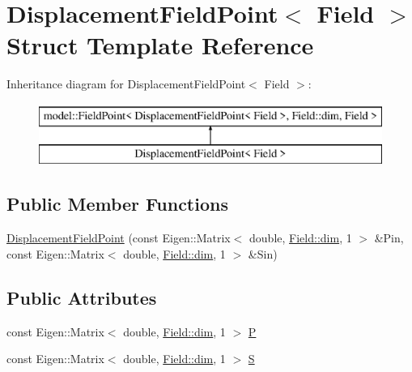 \hypertarget{struct_displacement_field_point}{}\section{Displacement\+Field\+Point$<$ Field $>$ Struct Template Reference}
\label{struct_displacement_field_point}
Inheritance diagram for Displacement\+Field\+Point$<$ Field $>$\+:\begin{figure}[H]
\begin{center}
\leavevmode
\includegraphics[height=2.000000cm]{struct_displacement_field_point}
\end{center}
\end{figure}
\subsection*{Public Member Functions}
\begin{DoxyCompactItemize}
\item 
\hyperlink{struct_displacement_field_point_ac0c7ee0a593a0f5d744060bf7149ab1b}{Displacement\+Field\+Point} (const Eigen\+::\+Matrix$<$ double, \hyperlink{plot_nd_a_8m_a382f3ca768b275b8d563604f7fc7df73}{Field\+::dim}, 1 $>$ \&Pin, const Eigen\+::\+Matrix$<$ double, \hyperlink{plot_nd_a_8m_a382f3ca768b275b8d563604f7fc7df73}{Field\+::dim}, 1 $>$ \&Sin)
\end{DoxyCompactItemize}
\subsection*{Public Attributes}
\begin{DoxyCompactItemize}
\item 
const Eigen\+::\+Matrix$<$ double, \hyperlink{plot_nd_a_8m_a382f3ca768b275b8d563604f7fc7df73}{Field\+::dim}, 1 $>$ \hyperlink{struct_displacement_field_point_acc1985dd4d8d33728bc0ceec7abfd2df}{P}
\item 
const Eigen\+::\+Matrix$<$ double, \hyperlink{plot_nd_a_8m_a382f3ca768b275b8d563604f7fc7df73}{Field\+::dim}, 1 $>$ \hyperlink{struct_displacement_field_point_a1f251b693c9f5fb5659a6be8021ea904}{S}
\end{DoxyCompactItemize}


